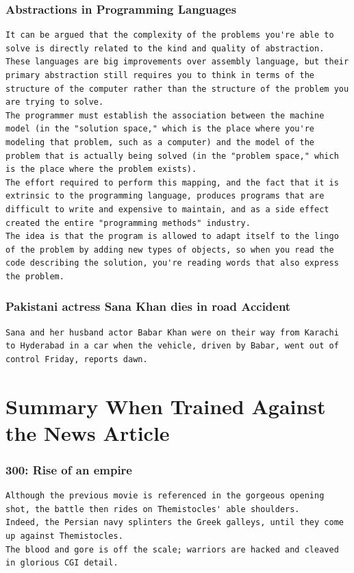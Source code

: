 \documentclass[BTech]{nitgoathesis}
\begin{document}
\subsubsection{Abstractions in Programming Languages}
\begin{lstlisting}[basicstyle=\scriptsize]
It can be argued that the complexity of the problems you're able to solve is directly related to the kind and quality of abstraction.
These languages are big improvements over assembly language, but their primary abstraction still requires you to think in terms of the structure of the computer rather than the structure of the problem you are trying to solve.
The programmer must establish the association between the machine model (in the "solution space," which is the place where you're modeling that problem, such as a computer) and the model of the problem that is actually being solved (in the "problem space," which is the place where the problem exists).
The effort required to perform this mapping, and the fact that it is extrinsic to the programming language, produces programs that are difficult to write and expensive to maintain, and as a side effect created the entire "programming methods" industry.
The idea is that the program is allowed to adapt itself to the lingo of the problem by adding new types of objects, so when you read the code describing the solution, you're reading words that also express the problem.
\end{lstlisting}
\subsubsection{Pakistani actress Sana Khan dies in road Accident}
\begin{lstlisting}[basicstyle=\scriptsize]
Sana and her husband actor Babar Khan were on their way from Karachi to Hyderabad in a car when the vehicle, driven by Babar, went out of control Friday, reports dawn.
\end{lstlisting}
\section{Summary When Trained Against the News Article}
\subsubsection{300: Rise of an empire}
\begin{lstlisting}[basicstyle=\scriptsize]
Although the previous movie is referenced in the gorgeous opening shot, the battle then rides on Themistocles' able shoulders.
Indeed, the Persian navy splinters the Greek galleys, until they come up against Themistocles.
The blood and gore is off the scale; warriors are hacked and cleaved in glorious CGI detail.
\end{lstlisting}
\end{document}
